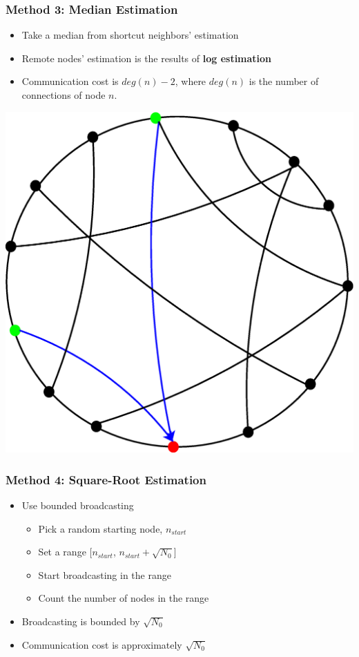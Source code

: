 \documentclass[red]{beamer}
\begin{document}
\begin{frame}
\frametitle{Method 3: Median Estimation}
\begin{minipage}{5cm}
\begin{itemize}
\item Take a median from shortcut neighbors' estimation
\item Remote nodes' estimation is the results of \textbf{log estimation} 
\item Communication cost is $deg(n)-2$, where $deg(n)$ is the number of connections of node $n$.
\end{itemize}
\end{minipage}
\begin{minipage}{5cm}
\centering
\includegraphics[scale=0.2]{figs/method3}
\end{minipage}
\end{frame}
\begin{frame}
\frametitle{Method 4: Square-Root Estimation}
\begin{itemize}
\item Use bounded broadcasting
\begin{itemize}
\item Pick a random starting node, $n_{start}$
\item Set a range [$n_{start}$, $n_{start}+\sqrt{N_0}$]
\item Start broadcasting in the range
\item Count the number of nodes in the range
\end{itemize}
\item Broadcasting is bounded by $\sqrt{N_0}$
\item Communication cost is approximately $\sqrt{N_0}$ 
\end{itemize}
\end{frame}
\end{document}
